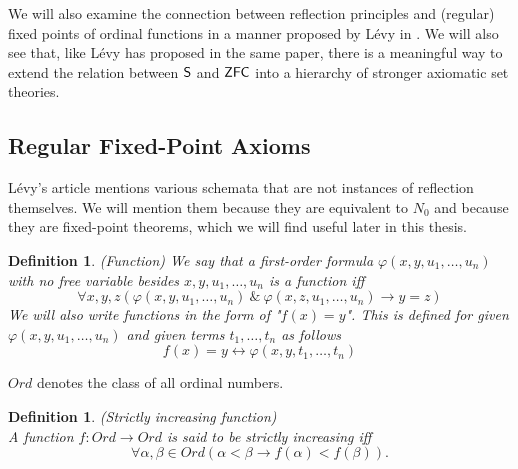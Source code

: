 \documentclass[12pt,a4paper]{article}
\newtheorem{definition}[theorem]{Definition}
\renewcommand{\iff}{\leftrightarrow}
\newcommand{\then}{\rightarrow}
\begin{document}
We will also examine the connection between reflection principles and (regular) fixed points of ordinal functions in a manner proposed by Lévy in \cite{Levy60a}. We will also see that, like Lévy has proposed in the same paper, there is a meaningful way to extend the relation between $\sf{S}$ and $\sf{ZFC}$ into a hierarchy of stronger axiomatic set theories. 


\subsection{Regular Fixed-Point Axioms}

Lévy's article mentions various schemata that are not instances of reflection themselves. We will mention them because they are equivalent to $N_0$ and because they are fixed-point theorems, which we will find useful later in this thesis.

\begin{definition}{(Function)}
We say that a first-order formula $\varphi(x, y, u_1, \ldots, u_n)$ with no free variable besides $x, y, u_1, \ldots, u_n$ is a function iff
\begin{equation}
\forall x, y, z (\varphi(x, y, u_1, \ldots, u_n)\ \&\ \varphi(x, z, u_1, \ldots, u_n) \then y=z)
\end{equation}
We will also write functions in the form of "$f(x) = y$". This is defined for given $\varphi(x, y, u_1, \ldots, u_n)$ and given terms $t_1, \ldots, t_n$ as follows
\begin{equation}
f(x)=y \iff \varphi(x, y, t_1, \ldots, t_n)
\end{equation}
\end{definition}

$Ord$ denotes the class of all ordinal numbers.
\begin{definition}{(Strictly increasing function)}\label{def:increasing_function}\\
A function $f: Ord \then Ord$ is said to be \emph{strictly increasing} iff
\begin{equation}
\forall \alpha, \beta \in Ord (\alpha < \beta \then f(\alpha) < f(\beta)).
\end{equation}
\end{definition}
\end{document}
